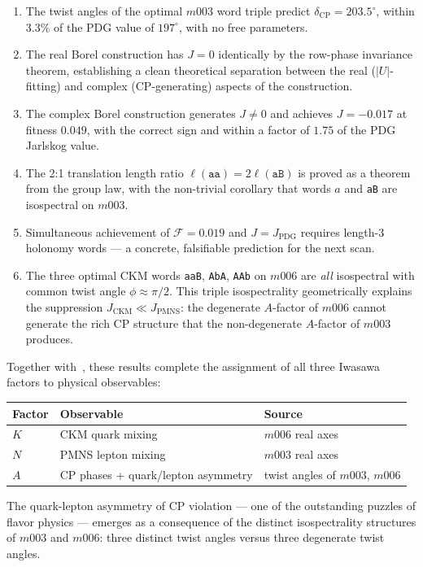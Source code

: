 \documentclass[epjc3]{svjour3}
\begin{document}
\begin{enumerate}
\item The twist angles of the optimal $m003$ word triple predict
$\delta_{\mathrm{CP}} = 203.5^\circ$, within $3.3\%$ of the PDG value
of $197^\circ$, with no free parameters.

\item The real Borel construction has $J = 0$ identically by the
row-phase invariance theorem, establishing a clean theoretical
separation between the real ($|U|$-fitting) and complex
(CP-generating) aspects of the construction.

\item The complex Borel construction generates $J \neq 0$ and
achieves $J = -0.017$ at fitness $0.049$, with the correct sign
and within a factor of $1.75$ of the PDG Jarlskog value.

\item The 2:1 translation length ratio $\ell(\texttt{aa}) = 2\ell(\texttt{aB})$
is proved as a theorem from the group law, with the non-trivial
corollary that words $a$ and \texttt{aB} are isospectral on $m003$.

\item Simultaneous achievement of $\mathcal{F} = 0.019$ and
$J = J_{\mathrm{PDG}}$ requires length-3 holonomy words — a
concrete, falsifiable prediction for the next scan.

\item The three optimal CKM words \texttt{aaB}, \texttt{AbA},
\texttt{AAb} on $m006$ are \emph{all} isospectral with common
twist angle $\phi \approx \pi/2$. This triple isospectrality
geometrically explains the suppression
$J_{\mathrm{CKM}} \ll J_{\mathrm{PMNS}}$: the degenerate
$A$-factor of $m006$ cannot generate the rich CP structure
that the non-degenerate $A$-factor of $m003$ produces.
\end{enumerate}

Together with~\cite{Gentry:CKM,Gentry:PMNS}, these results
complete the assignment of all three Iwasawa factors to
physical observables:
\begin{center}
\begin{tabular}{lll}
\toprule
Factor & Observable & Source \\
\midrule
$K$ & CKM quark mixing & $m006$ real axes \\
$N$ & PMNS lepton mixing & $m003$ real axes \\
$A$ & CP phases + quark/lepton asymmetry & twist angles of $m003$, $m006$ \\
\bottomrule
\end{tabular}
\end{center}
The quark-lepton asymmetry of CP violation --- one of the
outstanding puzzles of flavor physics --- emerges as a
consequence of the distinct isospectrality structures of
$m003$ and $m006$: three distinct twist angles versus
three degenerate twist angles.
\end{document}

